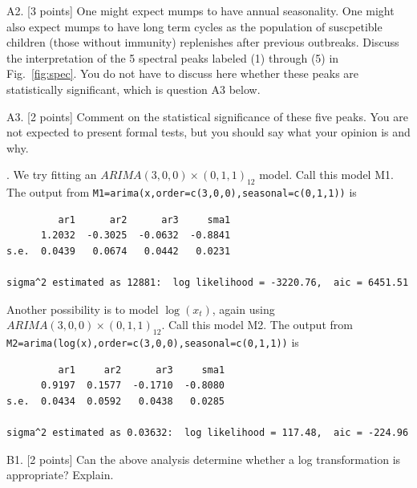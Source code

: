 \documentclass[11pt]{article}
\begin{document}
\vspace{1in}

\newpage

A2. [3 points] One might expect mumps to have annual seasonality. 
One might also expect mumps to have long term cycles as the
population of suscpetible children (those without immunity)
replenishes after previous outbreaks. 
Discuss the interpretation of the 5 spectral peaks labeled (1) through (5) in Fig.~\ref{fig:spec}. You do not have to discuss here whether these peaks are statistically significant, which is question A3 below.

\vspace{5in}

A3. [2 points] Comment on the statistical significance of these five peaks. You are not expected to present formal tests, but you should say what your opinion is and why.

\vspace{2in}

\newpage

. We try fitting an
$ARIMA(3,0,0)\times(0,1,1)_{12}$ model. Call this model M1. The output from {\texttt{M1=arima(x,order=c(3,0,0),seasonal=c(0,1,1))}} is
\vspace{-3mm}
\begin{verbatim}
         ar1      ar2      ar3     sma1
      1.2032  -0.3025  -0.0632  -0.8841
s.e.  0.0439   0.0674   0.0442   0.0231

sigma^2 estimated as 12881:  log likelihood = -3220.76,  aic = 6451.51
\end{verbatim}

Another possibility is to model %
$\log(x_t)$, again using 
$ARIMA(3,0,0)\times(0,1,1)_{12}$. Call this model M2. The output from 
\texttt{M2=arima(log(x),order=c(3,0,0),seasonal=c(0,1,1))}
is
\vspace{-3mm}
\begin{verbatim}
         ar1     ar2      ar3     sma1
      0.9197  0.1577  -0.1710  -0.8080
s.e.  0.0434  0.0592   0.0438   0.0285

sigma^2 estimated as 0.03632:  log likelihood = 117.48,  aic = -224.96
\end{verbatim}

B1. [2 points] Can the above analysis determine whether a log
transformation is appropriate? Explain.

\vspace{2in}
\end{document}
